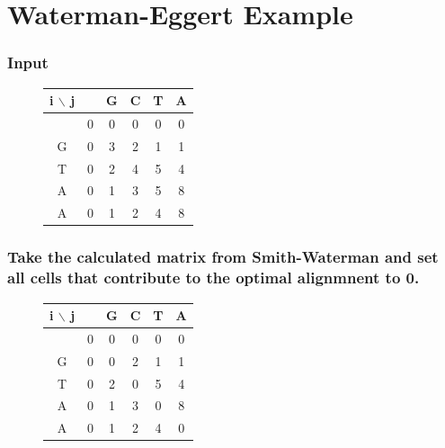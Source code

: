 

\section{Waterman-Eggert Example}\label{sec:waterman-eggert-example}

\subsubsection*{Input}
\begin{figure}[H]
    \centering
    \begin{tabular}{c || c | c | c | c | c |}
        i $\backslash$ j & \phantom{G} & G & C & T &  A   \\ \hline \hline
        & 0&0 &0 &0 &0  \\ \hline
        G&0 & 3 & 2 & 1 & 1 \\ \hline
        T&0 & 2 & 4 & 5 & 4 \\ \hline
        A&0 & 1 & 3 & 5 & 8 \\ \hline
        A&0 &1 &2 &4 & 8 \\ \hline
    \end{tabular}
    
\end{figure}


\subsubsection*{Take the calculated matrix from Smith-Waterman and set all cells that contribute to the optimal alignmnent to 0.}
\begin{figure}[H]
    \centering
    \begin{tabular}{c || c | c | c | c | c |}
        i $\backslash$ j & \phantom{G} & G & C & T &  A   \\ \hline \hline
        & 0&0 &0 &0 &0  \\ \hline
        G&0 & 0 & 2 & 1 & 1 \\ \hline
        T&0 & 2 & 0 & 5 & 4 \\ \hline
        A&0 & 1 & 3 & 0 & 8 \\ \hline
        A&0 &1 &2 &4 & 0\\ \hline
    \end{tabular}
    
\end{figure}

